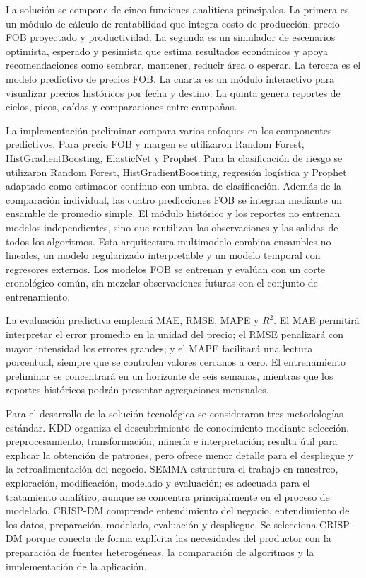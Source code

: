 La solución se compone de cinco funciones analíticas principales. La primera es un módulo de cálculo de rentabilidad que integra costo de producción, precio FOB proyectado y productividad. La segunda es un simulador de escenarios optimista, esperado y pesimista que estima resultados económicos y apoya recomendaciones como sembrar, mantener, reducir área o esperar. La tercera es el modelo predictivo de precios FOB. La cuarta es un módulo interactivo para visualizar precios históricos por fecha y destino. La quinta genera reportes de ciclos, picos, caídas y comparaciones entre campañas.

La implementación preliminar compara varios enfoques en los componentes predictivos. Para precio FOB y margen se utilizaron Random Forest, HistGradientBoosting, ElasticNet y Prophet. Para la clasificación de riesgo se utilizaron Random Forest, HistGradientBoosting, regresión logística y Prophet adaptado como estimador continuo con umbral de clasificación. Además de la comparación individual, las cuatro predicciones FOB se integran mediante un ensamble de promedio simple. El módulo histórico y los reportes no entrenan modelos independientes, sino que reutilizan las observaciones y las salidas de todos los algoritmos. Esta arquitectura multimodelo combina ensambles no lineales, un modelo regularizado interpretable y un modelo temporal con regresores externos. Los modelos FOB se entrenan y evalúan con un corte cronológico común, sin mezclar observaciones futuras con el conjunto de entrenamiento.

La evaluación predictiva empleará MAE, RMSE, MAPE y $R^2$. El MAE permitirá interpretar el error promedio en la unidad del precio; el RMSE penalizará con mayor intensidad los errores grandes; y el MAPE facilitará una lectura porcentual, siempre que se controlen valores cercanos a cero. El entrenamiento preliminar se concentrará en un horizonte de seis semanas, mientras que los reportes históricos podrán presentar agregaciones mensuales.

Para el desarrollo de la solución tecnológica se consideraron tres metodologías estándar. KDD organiza el descubrimiento de conocimiento mediante selección, preprocesamiento, transformación, minería e interpretación; resulta útil para explicar la obtención de patrones, pero ofrece menor detalle para el despliegue y la retroalimentación del negocio. SEMMA estructura el trabajo en muestreo, exploración, modificación, modelado y evaluación; es adecuada para el tratamiento analítico, aunque se concentra principalmente en el proceso de modelado. CRISP-DM comprende entendimiento del negocio, entendimiento de los datos, preparación, modelado, evaluación y despliegue. Se selecciona CRISP-DM porque conecta de forma explícita las necesidades del productor con la preparación de fuentes heterogéneas, la comparación de algoritmos y la implementación de la aplicación.

